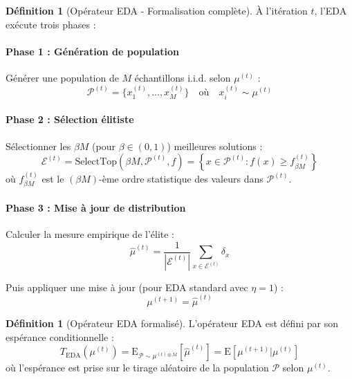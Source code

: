 \documentclass[12pt,a4paper]{article}
\theoremstyle{definition}
\newtheorem{definition}[theorem]{Définition}
\theoremstyle{remark}
\newcommand{\E}{\text{E}}
\begin{document}
	\begin{definition}[Opérateur EDA - Formalisation complète]
		À l'itération $t$, l'EDA exécute trois phases :
		
		\paragraph{Phase 1 : Génération de population}
		Générer une population de $M$ échantillons i.i.d. selon $\mu^{(t)}$ :
		\begin{equation}
			\mathcal{P}^{(t)} = \{x_1^{(t)}, \ldots, x_M^{(t)}\} \quad \text{où} \quad x_i^{(t)} \sim \mu^{(t)}
		\end{equation}
		
		\paragraph{Phase 2 : Sélection élitiste}
		Sélectionner les $\beta M$ (pour $\beta \in (0,1)$) meilleures solutions :
		\begin{equation}
			\mathcal{E}^{(t)} = \text{SelectTop}(\beta M, \mathcal{P}^{(t)}, f) = \left\{x \in \mathcal{P}^{(t)} : f(x) \geq f_{\beta M}^{(t)}\right\}
		\end{equation}
		où $f_{\beta M}^{(t)}$ est le $(\beta M)$-ème ordre statistique des valeurs dans $\mathcal{P}^{(t)}$.
		
		\paragraph{Phase 3 : Mise à jour de distribution}
		Calculer la mesure empirique de l'élite :
		\begin{equation}
			\hat{\mu}^{(t)} = \frac{1}{|\mathcal{E}^{(t)}|} \sum_{x\in\mathcal{E}^{(t)}} \delta_x
		\end{equation}
		
		Puis appliquer une mise à jour (pour EDA standard avec $\eta = 1$) :
		\begin{equation}
			\mu^{(t+1)} = \hat{\mu}^{(t)}
		\end{equation}
	\end{definition}
	
	\begin{definition}[Opérateur EDA formalisé]
		L'opérateur EDA est défini par son espérance conditionnelle :
		\begin{equation}
			T_{\text{EDA}}(\mu^{(t)}) = \E_{\mathcal{P}\sim\mu^{(t)\otimes M}}[\hat{\mu}^{(t)}] = \E[\mu^{(t+1)} | \mu^{(t)}]
		\end{equation}
		où l'espérance est prise sur le tirage aléatoire de la population $\mathcal{P}$ selon $\mu^{(t)}$.
	\end{definition}
	
\end{document}
